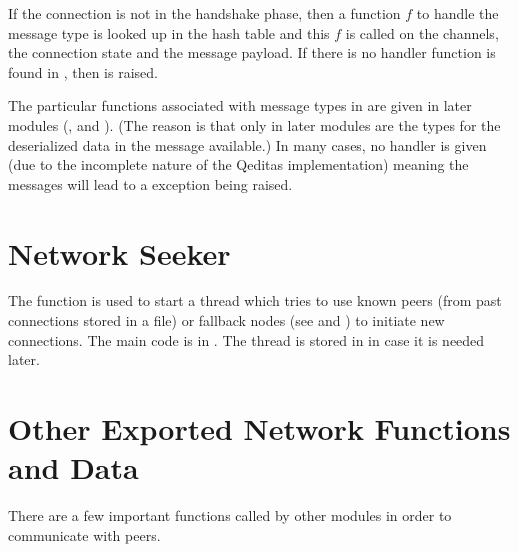 If the connection is not in the handshake phase, then
a function $f$ to handle the message type is looked up in the hash table {}
and this $f$ is called on the channels, the connection state and the message payload.
If there is no handler function is found in {},
then {} is raised.

The particular functions associated with message types in {}
are given in later modules (,  and ). (The reason is that only in later modules are the types for
the deserialized data in the message available.)
In many cases, no handler is given (due to the incomplete nature of the Qeditas implementation)
meaning the messages will lead to a {} exception being raised.

\section{Network Seeker}

The function {} is used to start a thread
which tries to use known peers (from past connections stored in a {} file)
or fallback nodes (see {} and {}) to initiate
new connections.
The main code is in {}.
The thread is stored in {}
in case it is needed later.

\section{Other Exported Network Functions and Data}

There are a few important functions called by other modules in order to
communicate with peers.


